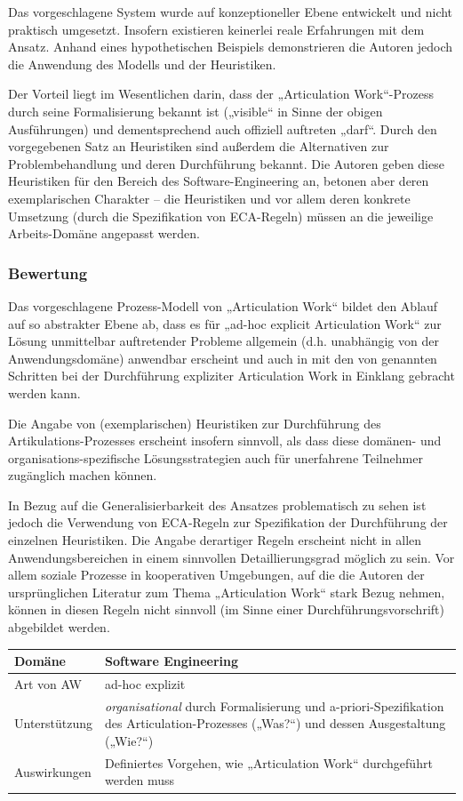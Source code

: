 Das vorgeschlagene System wurde auf konzeptioneller Ebene entwickelt und nicht praktisch umgesetzt. Insofern existieren keinerlei reale Erfahrungen mit dem Ansatz. Anhand eines hypothetischen Beispiels demonstrieren die Autoren jedoch die Anwendung des Modells und der Heuristiken.

Der Vorteil liegt im Wesentlichen darin, dass der „Articulation Work“-Prozess durch seine Formalisierung bekannt ist („visible“ in Sinne der obigen Ausführungen) und dementsprechend auch offiziell auftreten „darf“. Durch den vorgegebenen Satz an Heuristiken sind außerdem die Alternativen zur Problembehandlung und deren Durchführung bekannt. Die Autoren geben diese Heuristiken für den Bereich des Software-Engineering an, betonen aber deren exemplarischen Charakter -- die Heuristiken und vor allem deren konkrete Umsetzung (durch die Spezifikation von \gls{ECA}-Regeln) müssen an die jeweilige Arbeits-Domäne angepasst werden. 

\subsubsection{Bewertung}

Das vorgeschlagene Prozess-Modell von „Articulation Work“ bildet den Ablauf auf so abstrakter Ebene ab, dass es für „ad-hoc explicit Articulation Work“ zur Lösung unmittelbar auftretender Probleme allgemein (d.h. unabhängig von der Anwendungsdomäne) anwendbar erscheint und auch in mit den von \cite{Corbin93} genannten Schritten bei der Durchführung expliziter Articulation Work in Einklang gebracht werden kann.

Die Angabe von (exemplarischen) Heuristiken zur Durchführung des Artikulations-Prozesses erscheint insofern sinnvoll, als dass diese domänen- und organisations-spezifische Lösungsstrategien auch für unerfahrene Teilnehmer zugänglich machen können.

In Bezug auf die Generalisierbarkeit des Ansatzes problematisch zu sehen ist jedoch die Verwendung von \gls{ECA}-Regeln zur Spezifikation der Durchführung der einzelnen Heuristiken. Die Angabe derartiger Regeln erscheint nicht in allen Anwendungsbereichen in einem sinnvollen Detaillierungsgrad möglich zu sein. Vor allem soziale Prozesse in kooperativen Umgebungen, auf die die Autoren der ursprünglichen Literatur zum Thema „Articulation Work“ stark Bezug nehmen, können in diesen Regeln nicht sinnvoll (im Sinne einer Durchführungsvorschrift) abgebildet werden.
\\[1em]
\begin{tabular}{| p{3cm} | p{10cm} |}
  \hline
  Domäne & Software Engineering \\ \hline
  Art von AW & ad-hoc explizit \\ \hline
  Unterstützung & \emph{organisational} durch Formalisierung und a-priori-Spezifikation des Articulation-Prozesses („Was?“) und dessen Ausgestaltung („Wie?“) \\ \hline
  Auswirkungen & Definiertes Vorgehen, wie „Articulation Work“ durchgeführt werden muss \\ \hline
\end{tabular}

